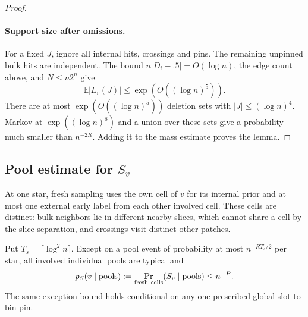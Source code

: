 \begin{proof}
\paragraph{Support size after omissions.}
For a fixed \(J\), ignore all internal hits, crossings and pins. The
remaining unpinned bulk hits are independent. The bound
\(n|D_i-.5|=O(\log n)\), the edge count above, and \(N\le n2^n\)
give
\[
 \mathbb E|L_v(J)|\le\exp(O((\log n)^5)).
\]
There are at most \(\exp(O((\log n)^5))\) deletion sets with
\(|J|\le(\log n)^4\). Markov at \(\exp((\log n)^8)\) and a union
over these sets give a probability much smaller than \(n^{-2R}\).
Adding it to the mass estimate proves the lemma.
\end{proof}

\subsection[Pool estimates]{Pool estimate for \(S_v\)}
\label{sec:pool-estimate-for-s-v}

At one star, fresh sampling uses the own cell of \(v\) for its internal
prior and at most one external early label from each other involved cell.
These cells are distinct: bulk neighbors lie in different nearby slices,
which cannot share a cell by the slice separation, and crossings visit
distinct other patches.

\begin{lemma}\label{lem:uniform-pool-list-estimate}
Put \(T_s=\lceil\log^2 n\rceil\). Except on a pool event of probability
at most \(n^{-RT_s/2}\) per star, all involved individual pools are
typical and
\begin{equation}
 p_S(v\mid\text{pools})
 :=\Pr_{\rm fresh\ cells}(S_v\mid\text{pools})\le n^{-P}.          \label{eq:source-23}
\end{equation}
The same exception bound holds conditional on any one prescribed global
slot-to-bin pin.
\end{lemma}

